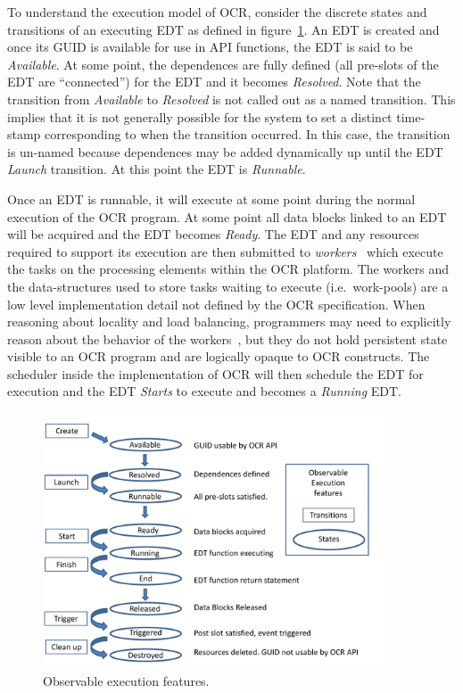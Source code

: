 To understand the execution model of OCR, consider the discrete states and
transitions of an executing EDT as defined in figure~\ref{fig:EDTexec}. An
EDT is created and once its GUID is available for use in API
functions, the EDT is said to be \emph{Available}. At some point, the dependences are fully defined (all
pre-slots of the EDT are ``connected'') for the EDT and it becomes
\emph{Resolved}.
Note that the transition from \emph{Available} to \emph{Resolved} is
not called out as a named transition. This implies that it is not
generally possible for the system to set a distinct time-stamp
corresponding to when the transition occurred. In this case, the transition is un-named
because dependences may be added dynamically up until the
EDT \emph{Launch} transition. At this point the
EDT is \emph{Runnable}.

Once an EDT is runnable, it will execute at some point during the normal execution
of the OCR program. At some point all data blocks linked to an EDT
will be acquired and the EDT becomes \emph{Ready}. The
EDT and any resources required to support its execution are then submitted to
\emph{workers}~\cite{GBRS09} which execute the tasks on
the processing elements within the OCR platform. The workers and the
data-structures used to store tasks waiting to execute
(i.e.\ work-pools) are a low level implementation detail not defined by
the OCR specification. When reasoning about locality and load
balancing, programmers may need to explicitly reason about the
behavior of the workers~\cite{Chatterjee13}, but they do not hold
persistent state visible to an OCR program and are logically opaque to
OCR constructs. The scheduler inside the implementation of OCR
will then schedule the EDT for execution and the EDT
\emph{Starts} to execute and
becomes a \emph{Running} EDT.


\begin{figure}
\centering
 \includegraphics[width=0.9\textwidth]{EDT_exec}
\caption{Observable execution features.}
\label{fig:EDTexec}
\end{figure}

